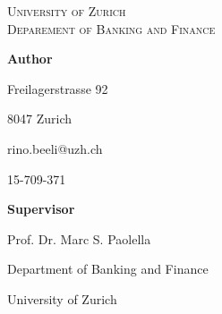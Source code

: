 
\begin{titlepage}
\begin{onehalfspacing}
\thispagestyle{empty}
\centering






{\Large\textsc{University of Zurich \\ Deparement of Banking and Finance}}


\vspace{4cm}


{\huge \textbf{ \titleBig{} }\par}


\vspace{3cm}


{\large \textbf{Author} \par}
\vspace{.2cm}
{\LARGE \author{} \par}
\vspace{.4cm}
{\large Freilagerstrasse 92 \par}
\vspace{.1cm}
{\large 8047 Zurich \par}
\vspace{.1cm}
{\large rino.beeli@uzh.ch \par}
\vspace{.1cm}
{\large 15-709-371 \par}


\vspace{1.6cm}


{\large \textbf{Supervisor} \par}
\vspace{.2cm}
{\Large Prof. Dr. Marc S. Paolella \par}
\vspace{.2cm}
{\large Department of Banking and Finance \par}
\vspace{.2cm}
{\large University of Zurich \par}


\vspace{2.5cm}

    
{\large \submissiondate{} \par}


\end{onehalfspacing}
\end{titlepage}


\clearpage
\newpage

\restoregeometry
\setcounter{page}{1}
